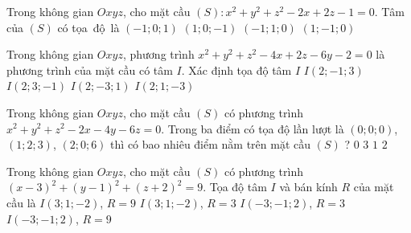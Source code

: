 \begin{ex}%
	Trong không gian $Oxyz$, cho mặt cầu $(S) \colon x^2 +y^2 +z^2 -2x +2z -1=0$.  Tâm của $(S)$ có tọa~độ~là
	 \choice
		{$(-1;0;1)$} 
		{\True $(1;0;-1)$} 
		 {$(-1;1;0)$}
		{$(1;-1;0)$} 
\end{ex}

\begin{ex}%
	Trong không gian $Oxyz$, phương trình $x^2+y^2+z^2-4x+2z-6y-2=0$ là phương trình của mặt cầu có tâm $I$. Xác định  tọa độ tâm $I$
	\choice 
		 {$I(2;-1;3)$}
		 {\True $I(2;3;-1)$}
		 {$I(2;-3;1)$}
		{$I(2;1;-3)$} 
\end{ex}

\begin{ex}%
	Trong không gian $Oxyz$, cho mặt cầu $(S)$ có phương trình  $x^2+y^2+z^2-2x-4y-6z=0$. Trong ba điểm có tọa độ lần lượt là $\left(0;0;0\right)$, $\left(1;2;3\right)$, $\left(2;0;6\right)$ thì có bao nhiêu điểm nằm trên mặt cầu $(S)$ ?
	 \choice
		{$0$} 
		{$3$} 
		{$1$} 
		 {\True $2$}
\end{ex}

\begin{ex}%
	Trong không  gian $Oxyz$, cho mặt cầu $(S)$ có phương trình $(x-3)^2+(y-1)^2+(z+2)^2=9$. Tọa độ tâm $I$ và bán kính $R$ của mặt cầu là
	 \choice
		{$I(3;1;-2)$, $R=9$} 
		{\True  $I(3;1;-2)$, $R=3$}
		 {$I(-3;-1;2)$, $R=3$}
		{$I(-3;-1;2)$,  $R=9$}
\end{ex}

